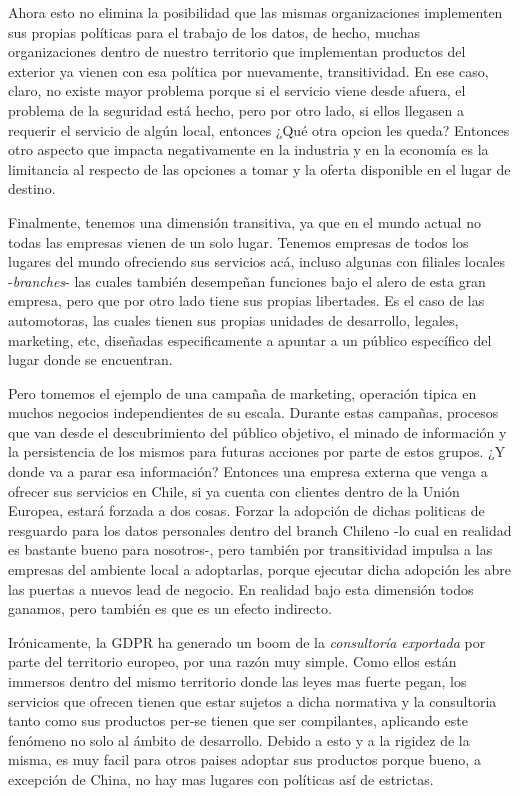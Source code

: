 \documentclass[11pt]{utalcaDoc}
\begin{document}
Ahora esto no elimina la posibilidad que las mismas organizaciones implementen sus propias políticas para el trabajo de los datos, de hecho, muchas organizaciones dentro de nuestro territorio que implementan productos del exterior ya vienen con esa política por nuevamente, transitividad. En ese caso, claro, no existe mayor problema porque si el servicio viene desde afuera, el problema de la seguridad está hecho, pero por otro lado, si ellos llegasen a requerir el servicio de algún local, entonces ¿Qué otra opcion les queda? Entonces otro aspecto que impacta negativamente en la industria y en la economía es la limitancia al respecto de las opciones a tomar y la oferta disponible en el lugar de destino.

Finalmente, tenemos una dimensión transitiva, ya que en el mundo actual no todas las empresas vienen de un solo lugar. Tenemos empresas de todos los lugares del mundo ofreciendo sus servicios acá, incluso algunas con filiales locales -\textit{branches}- las cuales también desempeñan funciones bajo el alero de esta gran empresa, pero que por otro lado tiene sus propias libertades. Es el caso de las automotoras, las cuales tienen sus propias unidades de desarrollo, legales, marketing, etc, diseñadas especificamente a apuntar a un público específico del lugar donde se encuentran.

Pero tomemos el ejemplo de una campaña de marketing, operación tipica en muchos negocios independientes de su escala. Durante estas campañas, procesos que van desde el descubrimiento del público objetivo, el minado de información y la persistencia de los mismos para futuras acciones por parte de estos grupos. ¿Y donde va a parar esa información? Entonces una empresa externa que venga a ofrecer sus servicios en Chile, si ya cuenta con clientes dentro de la Unión Europea, estará forzada a dos cosas. Forzar la adopción de dichas politicas de resguardo para los datos personales dentro del branch Chileno -lo cual en realidad es bastante bueno para nosotros-, pero también por transitividad impulsa a las empresas del ambiente local a adoptarlas, porque ejecutar dicha adopción les abre las puertas a nuevos lead de negocio. En realidad bajo esta dimensión todos ganamos, pero también es que es un efecto indirecto.

Irónicamente, la GDPR ha generado un boom de la \textit{consultoría exportada} por parte del territorio europeo, por una razón muy simple. Como ellos están immersos dentro del mismo territorio donde las leyes mas fuerte pegan, los servicios que ofrecen tienen que estar sujetos a dicha normativa y la consultoria tanto como sus productos per-se tienen que ser compilantes, aplicando este fenómeno no solo al ámbito de desarrollo. Debido a esto y a la rigidez de la misma, es muy facil para otros paises adoptar sus productos porque bueno, a excepción de China, no hay mas lugares con políticas así de estrictas.
\end{document}
